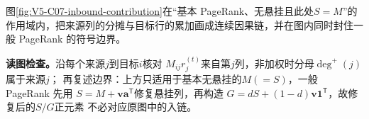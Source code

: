 \documentclass[UTF8,a4paper,11pt,openany]{ctexbook}
\begin{document}
\setcounter{page}{715}
\setcounter{chapter}{36}
\setcounter{section}{1}
\setcounter{figure}{3}
\pagestyle{headings}
图\ref{fig:V5-C07-inbound-contribution}在“基本 PageRank、无悬挂且此处$S=M$”的作用域内，把来源列的分摊与目标行的累加画成连续因果链，并在图内同时封住一般 PageRank 的符号边界。

\FloatBarrier
\noindent\textbf{读图检查。}沿每个来源$j$到目标$i$核对
$M_{ij}r_j^{(t)}$来自第$j$列，非加权时分母$\deg^+(j)$属于来源$j$；
再复述边界：上方只适用于基本无悬挂的$M(=S)$，一般 PageRank 先用
$S=M+\boldsymbol v\boldsymbol a^{\mathsf T}$修复悬挂列，再构造
$G=dS+(1-d)\boldsymbol v\boldsymbol1^{\mathsf T}$，故修复后的$S/G$正元素
不必对应原图中的入链。
\end{document}
